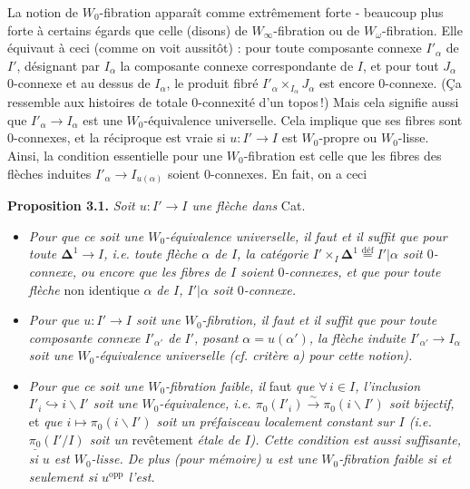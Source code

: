 \documentclass[11pt]{article}
\newcommand{\printedpage}[1]{\marginpar{\footnotesize p.~#1}}
\newcommand{\msp}[1]{\marginpar{\footnotesize [#1]}}
\newcommand{\defeq}{\overset{\text{déf}}{=}}
\begin{document}
\printedpage{27}
\msp{page 41}
La notion de $W_0$-fibration apparaît comme extrêmement forte - beaucoup plus forte à certains égards que celle (disons) de $W_\infty$-fibration ou de $W_\omega$-fibration. Elle équivaut à ceci (comme on voit aussitôt) : pour toute composante connexe $I'_\alpha$ de $I'$, désignant par $I_\alpha$ la composante connexe correspondante de $I$, et pour tout $J_\alpha$ 0-connexe et au dessus de $I_\alpha$, le produit fibré $I'_\alpha \times_{I_\alpha} J_\alpha$ est encore 0-connexe. (Ça ressemble aux histoires de totale 0-connexité d'un topos\,!) Mais cela signifie aussi que $I'_\alpha \longrightarrow I_\alpha$ est une $W_0$-équivalence universelle. Cela implique que ses fibres sont 0-connexes, et la réciproque est vraie si $u : I' \longrightarrow I$ est $W_0$-propre ou $W_0$-lisse. Ainsi, la condition essentielle pour une $W_0$-fibration est celle que les fibres des flèches induites $I'_\alpha \longrightarrow I_{u(\alpha)}$ soient 0-connexes. En fait, on a ceci

\noindent\textbf{Proposition 3.1.} \textit{Soit $u : I' \longrightarrow I$ une flèche dans} Cat.
\begin{itemize}
\item[\textit{a)}] \textit{Pour que ce soit une $W_0$-équivalence universelle, il faut et il suffit que pour toute $\boldsymbol{\Delta}^1 \longrightarrow I$, i.e. toute flèche $\alpha$ de $I$, la catégorie $I' \times_I \boldsymbol{\Delta}^1 \defeq I'|\alpha$ soit $0$-connexe, ou encore que les fibres de $I$ soient $0$-connexes, et que pour toute flèche} non identique \textit{$\alpha$ de $I$, $I'|\alpha$ soit $0$-connexe.}
\item[\textit{b)}] \textit{Pour que $u : I' \longrightarrow I$ soit une $W_0$-fibration, il faut et il suffit que pour toute composante connexe $I'_{\alpha'}$ de}
\msp{page 42}
\textit{$I'$, posant $\alpha = u(\alpha')$, la flèche induite $I'_{\alpha'} \longrightarrow I_\alpha$ soit une $W_0$-équivalence universelle (cf. critère a) pour cette notion).}
\item[\textit{c)}] \textit{Pour que ce soit une $W_0$-fibration faible, il} faut \textit{que $\forall\, i \in I$, l'inclusion $I'_i \hookrightarrow i\backslash I'$ soit une $W_0$-équivalence, i.e. $\pi_0(I'_i) \xrightarrow{\;\sim\;} \pi_0(i\backslash I')$ soit bijectif,} et \textit{que $i \longmapsto \pi_0(i\backslash I')$ soit un préfaisceau localement constant sur $I$ (i.e. $\underline{\pi_0}(I'/I)$ soit un} revêtement \textit{étale de $I$). Cette condition est aussi suffisante, si $u$ est $W_0$-lisse. De plus (pour mémoire) $u$ est une $W_0$-fibration faible si et seulement si $u^{\mathrm{opp}}$ l'est.}
\end{itemize}
\end{document}
